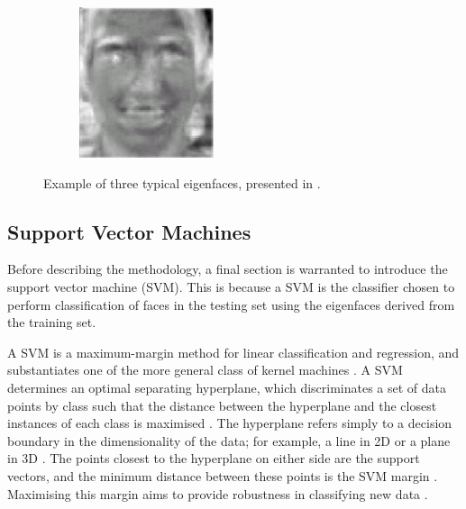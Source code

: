 \begin{figure}[ht]
\begin{subfigure}[b]{0.18\textwidth}
  \end{subfigure}
  \hspace{2em}
  \begin{subfigure}[b]{0.18\textwidth}
    \centering
    \includegraphics[width=\textwidth]{images/q3_eigenface_ex3.png}
  \end{subfigure}
  \caption{Example of three typical eigenfaces, presented in \cite{lovell_2008}.}
  \label{fig:eigenfaces_ex}
\end{figure}

\newpage
\subsection{Support Vector Machines}

Before describing the methodology, a final section is warranted to introduce the support vector machine (SVM). This is because a SVM is the classifier chosen to perform classification of faces in the testing set using the eigenfaces derived from the training set.

A SVM is a maximum-margin method for linear classification and regression, and substantiates one of the more general class of kernel machines \cite{alpaydin_2020}. A SVM determines an optimal separating hyperplane, which discriminates a set of data points by class such that the distance between the hyperplane and the closest instances of each class is maximised \cite{alpaydin_2020}. The hyperplane refers simply to a decision boundary in the dimensionality of the data; for example, a line in 2D or a plane in 3D \cite{gandhi_2018}. The points closest to the hyperplane on either side are the support vectors, and the minimum distance between these points is the SVM margin \cite{gandhi_2018}. Maximising this margin aims to provide robustness in classifying new data \cite{gandhi_2018}.

